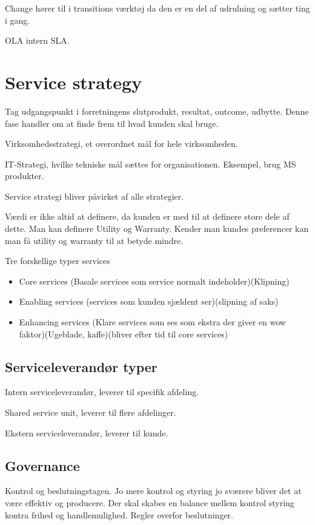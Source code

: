 Change hører til i transitions værktøj da den er en del af udrulning og sætter ting i gang.

OLA intern SLA.

\section{Service strategy}
Tag udgangspunkt i forretningens slutprodukt, resultat, outcome, udbytte.
Denne fase handler om at finde frem til hvad kunden skal bruge.

Virksomhedsstrategi, et overordnet mål for hele virksomheden.

IT-Strategi, hvilke tekniske mål sættes for organisationen. Eksempel, brug MS produkter.

Service strategi bliver påvirket af alle strategier.

Værdi er ikke altid at definere, da kunden er med til at definere store dele af dette. Man kan definere Utility og Warranty.
Kender man kundes preferencer kan man få utility og warranty til at betyde mindre. 

Tre forskellige typer services

\begin{itemize}
\item Core services (Basale services som service normalt indeholder)(Klipning)
\item Enabling services (services som kunden sjældent ser)(slipning af saks)
\item Enhancing services (Klare services som ses som ekstra der giver en wow faktor)(Ugeblade, kaffe)(bliver efter tid til core services)
\end{itemize}

\subsection{Serviceleverandør typer}
Intern serviceleverandør, leverer til specifik afdeling.

Shared service unit, leverer til flere afdelinger.

Ekstern serviceleverandør, leverer til kunde.

\subsection{Governance}
Kontrol og beslutningstagen. Jo mere kontrol og styring jo sværere bliver det at være effektiv og producere. Der skal skabes en balance mellem kontrol styring kontra frihed og handlemulighed. Regler overfor beslutninger.

